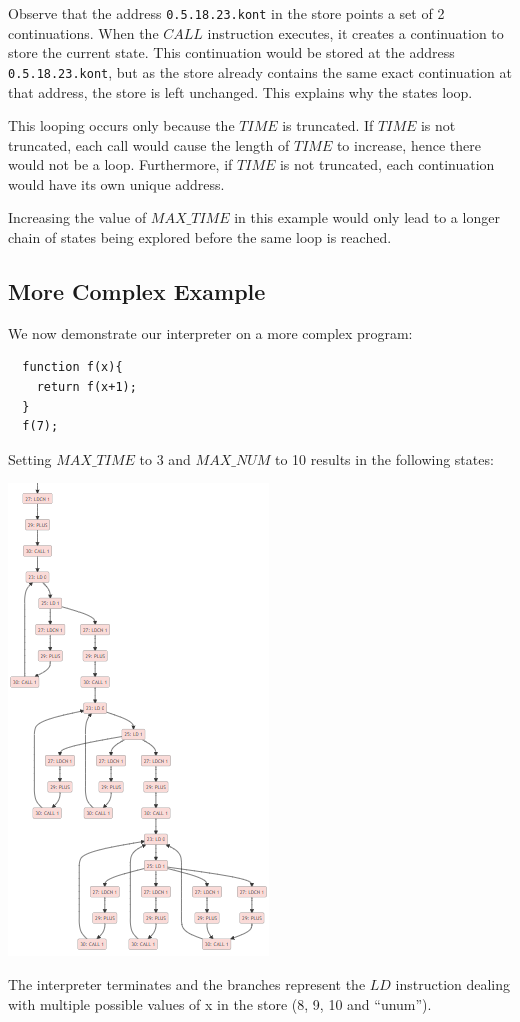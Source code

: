 \documentclass[12pt]{article}
\begin{document}
Observe that the address \verb|0.5.18.23.kont| in the store points a set of 2 continuations. When the $CALL$ instruction executes, it creates a continuation to store the current state. This continuation would be stored at the address \verb|0.5.18.23.kont|, but as the store already contains the same exact continuation at that address, the store is left unchanged. This explains why the states loop.

This looping occurs only because the $TIME$ is truncated. If $TIME$ is not truncated, each call would cause the length of $TIME$ to increase, hence there would not be a loop. Furthermore, if $TIME$ is not truncated, each continuation would have its own unique address.

Increasing the value of $MAX\_TIME$ in this example would only lead to a longer chain of states being explored before the same loop is reached.

\subsection{More Complex Example}
We now demonstrate our interpreter on a more complex program:
\begin{verbatim}
  function f(x){
    return f(x+1);
  }
  f(7);
\end{verbatim}
Setting $MAX\_TIME$ to 3 and $MAX\_NUM$ to 10 results in the following states:
\begin{center}
  \includegraphics[scale=0.7]{complex_graph.png}
\end{center}
The interpreter terminates and the branches represent the $LD$ instruction dealing with multiple possible values of x in the store (8, 9, 10 and ``unum'').


\end{document}
